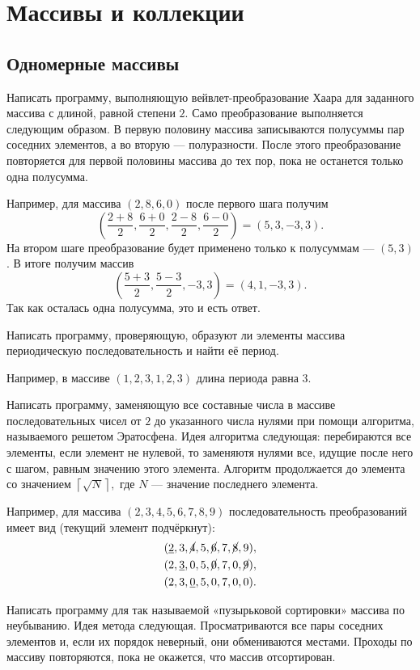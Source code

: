 \section{Массивы и коллекции}


\subsection{Одномерные массивы}

\task Написать программу, выполняющую вейвлет-преобразование Хаара для
заданного массива с длиной, равной степени $2$. Само преобразование
выполняется следующим образом. В первую половину массива записываются
полусуммы пар соседних элементов, а во вторую — полуразности. После
этого преобразование повторяется для первой половины массива до тех
пор, пока не останется только одна полусумма.

Например, для массива $(2, 8, 6, 0)$ после первого шага получим
\[
\left(\frac{2+8}2, \frac{6+0}2, \frac{2-8}2, \frac{6-0}2\right) = (5, 3, -3, 3).
\]
На втором шаге преобразование будет применено только к полусуммам —
$(5, 3)$. В итоге получим массив
\[
\left(\frac{5+3}2, \frac{5-3}2, -3, 3\right) = (4, 1, -3, 3).
\]
Так как осталась одна полусумма, это и есть ответ.

\task Написать программу, проверяющую, образуют ли элементы массива
периодическую последовательность и найти её период.

Например, в массиве $(1, 2, 3, 1, 2, 3)$ длина периода равна $3$.

\task Написать программу, заменяющую все составные числа в массиве
последовательных чисел от $2$ до указанного числа нулями при помощи
алгоритма, называемого решетом Эратосфена. Идея алгоритма следующая:
перебираются все элементы, если элемент не нулевой, то заменяютя
нулями все, идущие после него с шагом, равным значению этого
элемента. Алгоритм продолжается до элемента со значением
$\left\lceil\sqrt N\right\rceil,$ где $N$ — значение последнего
элемента.

Например, для массива $(2, 3, 4, 5, 6, 7, 8, 9)$ последовательность
преобразований имеет вид (текущий элемент подчёркнут):
\begin{eqnarray*}
&(\underline2, 3, \cancel4, 5, \cancel6, 7, \cancel8, 9),\\
&(2, \underline3, 0, 5, \cancel0, 7, 0, \cancel9),\\
&(2, 3, \underline0, 5, 0, 7, 0, 0).
\end{eqnarray*}

\task Написать программу для так называемой «пузырьковой сортировки»
массива по неубыванию. Идея метода следующая. Просматриваются все пары
соседних элементов и, если их порядок неверный, они обмениваются
местами. Проходы по массиву повторяются, пока не окажется, что массив
отсортирован.

